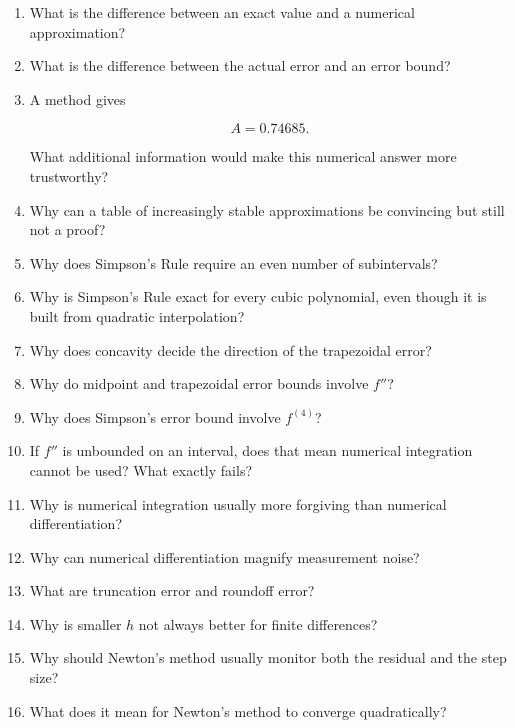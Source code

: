 \begin{enumerate}
\item What is the difference between an exact value and a numerical approximation?

\item What is the difference between the actual error and an error bound?

\item A method gives

\[
A=0.74685.
\]

What additional information would make this numerical answer more trustworthy?

\item Why can a table of increasingly stable approximations be convincing but still not a
proof?

\item Why does Simpson's Rule require an even number of subintervals?

\item Why is Simpson's Rule exact for every cubic polynomial, even though it is built from
quadratic interpolation?

\item Why does concavity decide the direction of the trapezoidal error?

\item Why do midpoint and trapezoidal error bounds involve \(f''\)?

\item Why does Simpson's error bound involve \(f^{(4)}\)?

\item If \(f''\) is unbounded on an interval, does that mean numerical integration cannot
be used?  What exactly fails?

\item Why is numerical integration usually more forgiving than numerical differentiation?

\item Why can numerical differentiation magnify measurement noise?

\item What are truncation error and roundoff error?

\item Why is smaller \(h\) not always better for finite differences?

\item Why should Newton's method usually monitor both the residual and the step size?

\item What does it mean for Newton's method to converge quadratically?


\end{enumerate}
